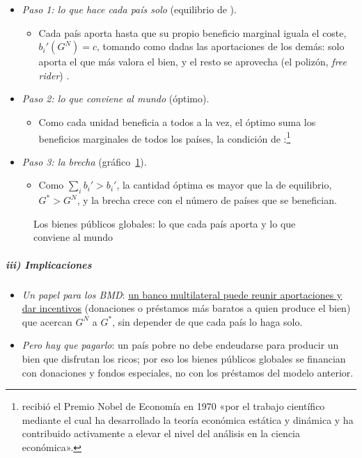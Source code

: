 \documentclass[11pt]{article}
\begin{document}
\begin{itemize}
\item \emph{Paso 1: lo que hace cada país solo} (equilibrio de ).
  \begin{itemize}
  \item Cada país aporta hasta que su propio beneficio marginal iguala el coste, $b_i'(G^N)=c$, tomando como dadas las aportaciones de los demás: solo aporta el que más valora el bien, y el resto se aprovecha (el polizón, \emph{free rider}) .
  \end{itemize}
\item \emph{Paso 2: lo que conviene al mundo} (óptimo).
  \begin{itemize}
  \item Como cada unidad beneficia a todos a la vez, el óptimo suma los beneficios marginales de todos los países, la condición de :\footnote{ recibió el Premio Nobel de Economía en 1970 «por el trabajo científico mediante el cual ha desarrollado la teoría económica estática y dinámica y ha contribuido activamente a elevar el nivel del análisis en la ciencia económica»\nocite{Nobel1970Samuelson}.}
  \end{itemize}
\item \emph{Paso 3: la brecha} (gráfico~\ref{fig:bpg}).
  \begin{itemize}
  \item Como $\sum_i b_i'>b_i'$, la cantidad óptima es mayor que la de equilibrio, $G^*>G^N$, y la brecha crece con el número de países que se benefician.
  \end{itemize}
\end{itemize}

\begin{figure}[H]
\centering
\caption{Los bienes públicos globales: lo que cada país aporta y lo que conviene al mundo}\label{fig:bpg}
\end{figure}

\subparagraph{iii) Implicaciones}

\begin{itemize}
\item \emph{Un papel para los BMD}: \uline{un banco multilateral puede reunir aportaciones y dar incentivos} (donaciones o préstamos más baratos a quien produce el bien) que acercan $G^N$ a $G^*$, sin depender de que cada país lo haga solo.
\item \emph{Pero hay que pagarlo}: un país pobre no debe endeudarse para producir un bien que disfrutan los ricos; por eso los bienes públicos globales se financian con donaciones y fondos especiales, no con los préstamos del modelo anterior.
\end{itemize}
\end{document}
